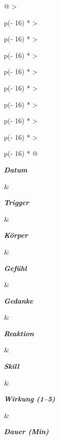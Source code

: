 \begin{longtable}[]{@{}
  >{\raggedright\arraybackslash}p{(\columnwidth - 16\tabcolsep) * }
  >{\raggedright\arraybackslash}p{(\columnwidth - 16\tabcolsep) * }
  >{\raggedright\arraybackslash}p{(\columnwidth - 16\tabcolsep) * }
  >{\raggedright\arraybackslash}p{(\columnwidth - 16\tabcolsep) * }
  >{\raggedright\arraybackslash}p{(\columnwidth - 16\tabcolsep) * }
  >{\raggedright\arraybackslash}p{(\columnwidth - 16\tabcolsep) * }
  >{\raggedright\arraybackslash}p{(\columnwidth - 16\tabcolsep) * }
  >{\raggedright\arraybackslash}p{(\columnwidth - 16\tabcolsep) * }
  >{\raggedright\arraybackslash}p{(\columnwidth - 16\tabcolsep) * }@{}}
\toprule\noalign{}
\begin{minipage}[b]{\linewidth}\raggedright
\emph{\textbf{Datum}}
\end{minipage} \& \begin{minipage}[b]{\linewidth}\raggedright
\emph{\textbf{Trigger}}
\end{minipage} \& \begin{minipage}[b]{\linewidth}\raggedright
\emph{\textbf{Körper}}
\end{minipage} \& \begin{minipage}[b]{\linewidth}\raggedright
\emph{\textbf{Gefühl}}
\end{minipage} \& \begin{minipage}[b]{\linewidth}\raggedright
\emph{\textbf{Gedanke}}
\end{minipage} \& \begin{minipage}[b]{\linewidth}\raggedright
\emph{\textbf{Reaktion}}
\end{minipage} \& \begin{minipage}[b]{\linewidth}\raggedright
\emph{\textbf{Skill}}
\end{minipage} \& \begin{minipage}[b]{\linewidth}\raggedright
\emph{\textbf{Wirkung (1--5)}}
\end{minipage} \& \begin{minipage}[b]{\linewidth}\raggedright
\emph{\textbf{Dauer (Min)}}
\end{minipage} \\
\midrule\noalign{}
\endhead
\bottomrule\noalign{}
\endlastfoot

\end{longtable}
